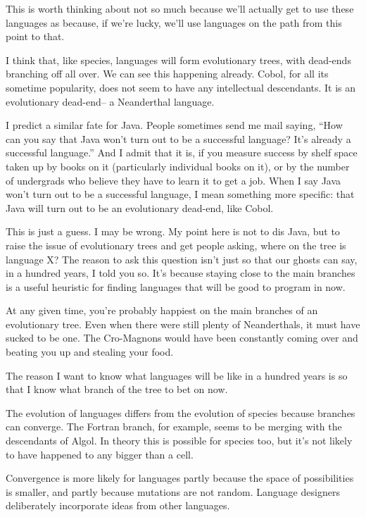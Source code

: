 \documentclass[12pt]{book}
\begin{document}
This is worth thinking about not so much because we'll actually get to
use these languages as because, if we're lucky, we'll use languages on
the path from this point to that.

I think that, like species, languages will form evolutionary trees, with
dead-ends branching off all over. We can see this happening already.
Cobol, for all its sometime popularity, does not seem to have any
intellectual descendants. It is an evolutionary dead-end-- a Neanderthal
language.

I predict a similar fate for Java. People sometimes send me mail saying,
``How can you say that Java won't turn out to be a successful language?
It's already a successful language.'' And I admit that it is, if you
measure success by shelf space taken up by books on it (particularly
individual books on it), or by the number of undergrads who believe they
have to learn it to get a job. When I say Java won't turn out to be a
successful language, I mean something more specific: that Java will turn
out to be an evolutionary dead-end, like Cobol.

This is just a guess. I may be wrong. My point here is not to dis Java,
but to raise the issue of evolutionary trees and get people asking,
where on the tree is language X? The reason to ask this question isn't
just so that our ghosts can say, in a hundred years, I told you so. It's
because staying close to the main branches is a useful heuristic for
finding languages that will be good to program in now.

At any given time, you're probably happiest on the main branches of an
evolutionary tree. Even when there were still plenty of Neanderthals, it
must have sucked to be one. The Cro-Magnons would have been constantly
coming over and beating you up and stealing your food.

The reason I want to know what languages will be like in a hundred years
is so that I know what branch of the tree to bet on now.

The evolution of languages differs from the evolution of species because
branches can converge. The Fortran branch, for example, seems to be
merging with the descendants of Algol. In theory this is possible for
species too, but it's not likely to have happened to any bigger than a
cell.

Convergence is more likely for languages partly because the space of
possibilities is smaller, and partly because mutations are not random.
Language designers deliberately incorporate ideas from other languages.
\end{document}
